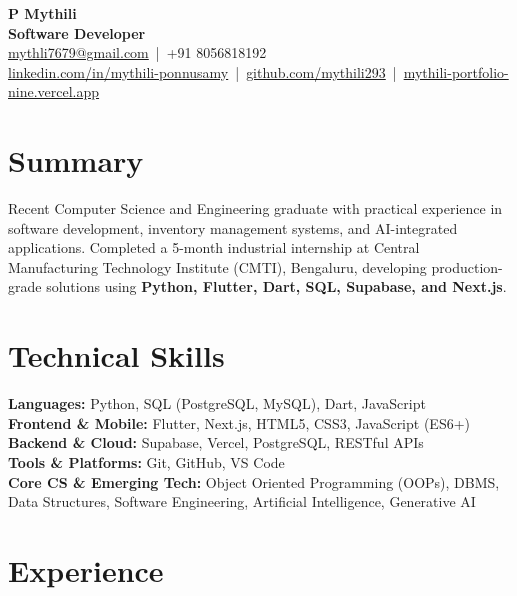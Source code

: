 \documentclass[11pt,a4paper]{article}
\newcommand{\headerSep}{\,|\,}
\begin{document}
\begin{center}
    {\LARGE\bfseries P Mythili}\\[3pt]
    {\large\bfseries Software Developer}\\[2pt]

    \small
    \href{mailto:mythli7679@gmail.com}{mythli7679@gmail.com}
    \headerSep{} +91 8056818192\\[2pt]

    \href{https://www.linkedin.com/in/mythili-ponnusamy}{linkedin.com/in/mythili-ponnusamy}
    \headerSep{}
    \href{https://github.com/mythili293}{github.com/mythili293}
    \headerSep{}
    \href{https://mythili-portfolio-nine.vercel.app/}{mythili-portfolio-nine.vercel.app}
\end{center}

\section*{Summary}
Recent Computer Science and Engineering graduate with practical experience in software development, inventory management systems, and AI-integrated applications. Completed a 5-month industrial internship at Central Manufacturing Technology Institute (CMTI), Bengaluru, developing production-grade solutions using \textbf{Python, Flutter, Dart, SQL, Supabase, and Next.js}.

\section*{Technical Skills}
\textbf{Languages:} Python, SQL (PostgreSQL, MySQL), Dart, JavaScript\\
\textbf{Frontend \& Mobile:} Flutter, Next.js, HTML5, CSS3, JavaScript (ES6+)\\
\textbf{Backend \& Cloud:} Supabase, Vercel, PostgreSQL, RESTful APIs\\
\textbf{Tools \& Platforms:} Git, GitHub, VS Code\\
\textbf{Core CS \& Emerging Tech:} Object Oriented Programming (OOPs), DBMS, Data Structures, Software Engineering, Artificial Intelligence, Generative AI

\section*{Experience}
\end{document}
